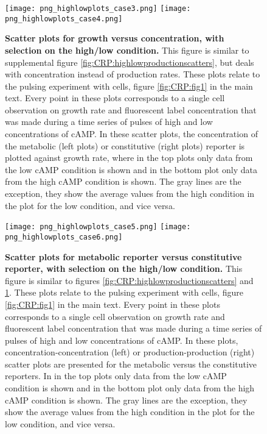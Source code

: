 \begin{figure}%
	\centering
	\texttt{[image: png\_highlowplots\_case3.png]}
	\texttt{[image: png\_highlowplots\_case4.png]}	
	\caption{ 
		\textbf{Scatter plots for growth versus concentration, with selection on the high/low condition.}
		This figure is similar to supplemental figure \ref{fig:CRP:highlowproductionscatters}, but deals with concentration instead of production rates.
        These plots relate to the pulsing experiment with \dcamp cells, figure \ref{fig:CRP:fig1} in the main text.
        Every point in these plots corresponds to a single cell observation on growth rate and fluorescent label concentration
        that was made during a time series of pulses of high and low concentrations of cAMP.
In these scatter plots, the concentration of the metabolic (left plots) or constitutive (right plots) reporter is plotted against growth rate, where in the top plots only data from the low cAMP condition is shown and in the bottom plot only data from the high cAMP condition is shown. The gray lines are the exception, they show the average values from the high condition in the plot for the low condition, and vice versa.
	}
	\label{fig:CRP:highlowpconcentrationscatters}
\end{figure}%

\begin{figure}%
	\centering
	\texttt{[image: png\_highlowplots\_case5.png]}
	\texttt{[image: png\_highlowplots\_case6.png]}	
	\caption{ 
		\textbf{Scatter plots for metabolic reporter versus constitutive reporter, with selection on the high/low condition.}
        This figure is similar to 
        figures \ref{fig:CRP:highlowproductionscatters} and \ref{fig:CRP:highlowpconcentrationscatters}.
                These plots relate to the pulsing experiment with \dcamp cells, figure \ref{fig:CRP:fig1} in the main text.
        Every point in these plots corresponds to a single cell observation on growth rate and fluorescent label concentration
        that was made during a time series of pulses of high and low concentrations of cAMP.
		In these plots, concentration-concentration (left) or production-production (right) scatter plots are presented for the metabolic versus the constitutive reporters.
		In in the top plots only data from the low cAMP condition is shown and in the bottom plot only data from the high cAMP condition is shown. 
		The gray lines are the exception, they show the average values from the high condition in the plot for the low condition, and vice versa.		
	}
	\label{fig:CRP:highlowconcconcprodprod}
\end{figure}%


